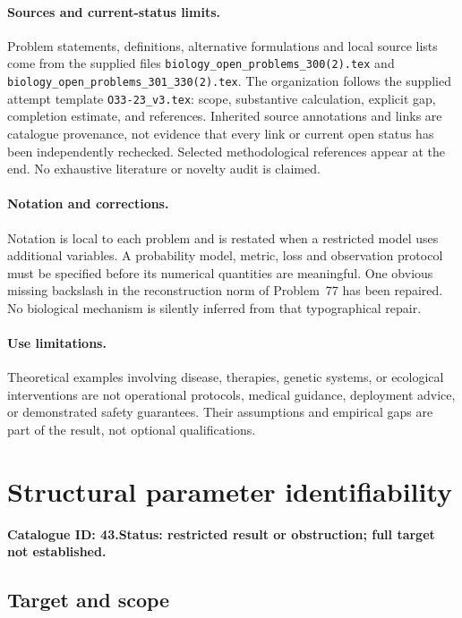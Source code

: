 \documentclass[11pt]{article}
\begin{document}
\paragraph{Sources and current-status limits.}
Problem statements, definitions, alternative formulations and local source lists
come from the supplied files
\texttt{biology\_open\_problems\_300(2).tex} and
\texttt{biology\_open\_problems\_301\_330(2).tex}.
The organization follows the supplied attempt template
\texttt{O33-23\_v3.tex}: scope, substantive calculation, explicit gap,
completion estimate, and references. Inherited source annotations and links are
catalogue provenance, not evidence that every link or current open status has
been independently rechecked. Selected methodological references appear at the
end. No exhaustive literature or novelty audit is claimed.

\paragraph{Notation and corrections.}
Notation is local to each problem and is restated when a restricted model uses
additional variables. A probability model, metric, loss and observation protocol
must be specified before its numerical quantities are meaningful. One obvious
missing backslash in the reconstruction norm of Problem~77 has been repaired.
No biological mechanism is silently inferred from that typographical repair.

\paragraph{Use limitations.}
Theoretical examples involving disease, therapies, genetic systems, or ecological
interventions are not operational protocols, medical guidance, deployment advice,
or demonstrated safety guarantees. Their assumptions and empirical gaps are part
of the result, not optional qualifications.

\setcounter{section}{42}
\section{Structural parameter identifiability}
\label{prob:043}
\noindent\textbf{Catalogue ID: 43.}\quad \textbf{Status: restricted result or obstruction; full target not established.}
\subsection{Target and scope}
\end{document}
